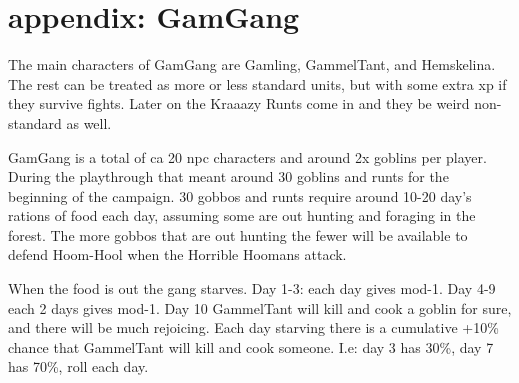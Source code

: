 \section*{appendix: GamGang}

The main characters of GamGang are Gamling, GammelTant, and Hemskelina. The rest can be treated as more or less standard units, but with some extra xp if they survive fights. Later on the Kraaazy Runts come in and they be weird non-standard as well.

GamGang is a total of ca 20 npc characters and around 2x goblins per player. During the playthrough that meant around 30 goblins and runts for the beginning of the campaign. 30 gobbos and runts require around 10-20 day's rations of food each day, assuming some are out hunting and foraging in the forest. The more gobbos that are out hunting the fewer will be available to defend Hoom-Hool when the Horrible Hoomans attack.

When the food is out the gang starves. Day 1-3: each day gives mod-1. Day 4-9 each 2 days gives mod-1. Day 10 GammelTant will kill and cook a goblin for sure, and there will be much rejoicing. Each day starving there is a cumulative +10\% chance that GammelTant will kill and cook someone. I.e: day 3 has 30\%, day 7 has 70\%, roll each day.

